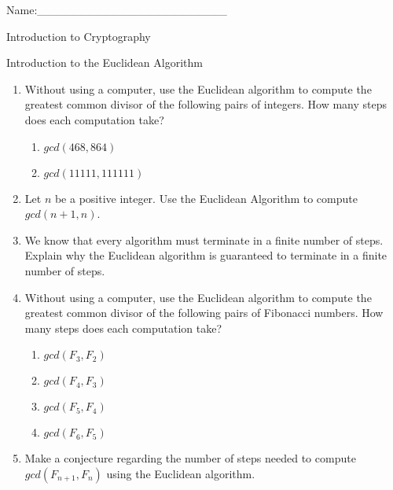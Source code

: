 \documentclass[12pt]{amsart}
\theoremstyle{definition}
\theoremstyle{remark}
\numberwithin{equation}{section}
\begin{document}
\begin{flushright}
Name:\_\_\_\_\_\_\_\_\_\_\_\_\_\_\_\_\_\_\_\_\_\_\_
\end{flushright}
\vspace{10pt}
\begin{center}
Introduction to Cryptography

Introduction to the Euclidean Algorithm
\end{center}


\begin{enumerate}
\item Without using a computer, use the Euclidean algorithm to compute the greatest common divisor of the following pairs of integers. How many steps does each computation take?
\begin{enumerate}
\item $gcd(468,864)$
\item $gcd(11111,111111)$
\end{enumerate}

\item Let $n$ be a positive integer. Use the Euclidean Algorithm to compute $gcd(n+1,n)$.

\item We know that every algorithm must terminate in a finite number of steps. Explain why the Euclidean algorithm is guaranteed to terminate in a finite number of steps.

\item Without using a computer, use the Euclidean algorithm to compute the greatest common divisor of the following pairs of Fibonacci numbers. How many steps does each computation take? 
\begin{enumerate}
\item $gcd(F_3,F_2)$
\item $gcd(F_4,F_3)$
\item $gcd(F_5,F_4)$
\item $gcd(F_6,F_5)$
\end{enumerate}

\item Make a conjecture regarding the number of steps needed to compute $gcd(F_{n+1},F_n)$ using the Euclidean algorithm.


\end{enumerate}
\end{document}
